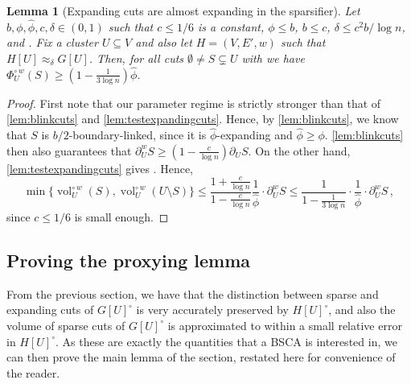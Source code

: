 \documentclass[epsfig,letter,11pt]{article}
\numberwithin{equation}{section}
\newcommand{\wvolc}[2]{\operatorname{vol}_{#2}^{\circ \,w} (#1)}
\newcommand{\unspc}[2]{\Phi_{#2}^\circ (#1)}
\newcommand{\wspc}[2]{\Phi_{#2}^{\circ \,w} (#1)}
\newcommand{\uncut}[2]{{\partial}_{#2} #1}
\newcommand{\wcut}[2]{\partial^w_{#2} #1}
\renewcommand{\hat}{\widehat}
\newtheorem{lemma}[theorem]{Lemma}
\begin{document}
\begin{lemma}[Expanding cuts are almost expanding in the sparsifier]
	\label{lem:boundlinkexpsparse}
Let $b, \phi,\hat{\phi}, c,\delta \in (0,1)$ such that $c \leq 1/6$ is a constant, $\phi \le b$, $b \le c$, $\delta \le c^2 b/ \log n$, and \smash{$\phi \le \hat{\phi} \le \phi/b$}.  Fix a cluster $U \subseteq V$ and also let $H=(V,E',w)$ such that $H[U] \approx_\delta G[U]$. Then, for all cuts $\emptyset \neq S \subsetneq U$ with \smash{$\unspc{S}{U} \ge \hat{\phi}$} we have $\wspc{S}{U} \geq (1 - \frac{1}{3\log n}) \hat{\phi}$.
\end{lemma}
\begin{proof}
	First note that our parameter regime is strictly stronger than that of \cref{lem:blinkcuts} and \cref{lem:testexpandingcuts}. Hence, by \cref{lem:blinkcuts}, we know that $S$ is $b/2$-boundary-linked, since it is $\hat{\phi}$-expanding and $\hat{\phi} \ge \phi$. \cref{lem:blinkcuts} then also guarantees that $\wcut{S}{U} \ge (1-\frac{c}{\log n}) \uncut{S}{U}$. On the other hand, \cref{lem:testexpandingcuts} gives \smash{$	\min \{\wvolc{S}{U},\wvolc{U \setminus S}{U}\} \le (1+\frac{c}{\log n})/{\hat{\phi}} \cdot \uncut{S}{U}$}. Hence,
	\begin{equation*}
		\min \{\wvolc{S}{U},\wvolc{U \setminus S}{U}\} \le \frac{1+\frac{c}{\log n}}{1-\frac{c}{\log n}}\frac{1}{\hat{\phi}} \cdot \wcut{S}{U} \leq  \frac{1}{1-\frac{1}{3\log n}}\cdot \frac{1}{\hat{\phi}} \cdot \wcut{S}{U}  \, ,
	\end{equation*}
since $c \le 1/6$ is small enough.
\end{proof}

\subsection{Proving the proxying lemma}
\label{subsec:proofproxying}
From the previous section, we have that the distinction between sparse and expanding cuts of $G[U]^\circ$ is very accurately preserved by $H[U]^\circ$, and also the volume of sparse cuts of $G[U]^\circ$ is approximated to within a small relative error in $H[U]^\circ$. As these are exactly the quantities that a BSCA is interested in, we can then prove the main lemma of the section, restated here for convenience of the reader.

\reduction*
\end{document}
